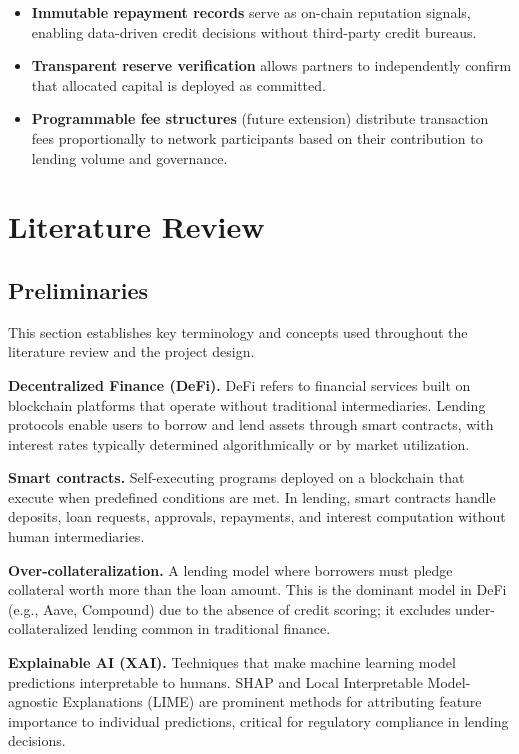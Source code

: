 \documentclass[12pt,a4paper]{report}
\begin{document}
\begin{itemize}[noitemsep]
\item \textbf{Immutable repayment records} serve as on-chain reputation signals, enabling data-driven credit decisions without third-party credit bureaus.
\item \textbf{Transparent reserve verification} allows partners to independently confirm that allocated capital is deployed as committed.
\item \textbf{Programmable fee structures} (future extension) distribute transaction fees proportionally to network participants based on their contribution to lending volume and governance.
\end{itemize}


\chapter{Literature Review}

\section{Preliminaries}

This section establishes key terminology and concepts used throughout the literature review and the project design.

\hangindent=0.5in \textbf{Decentralized Finance (DeFi).} DeFi refers to financial services built on blockchain platforms that operate without traditional intermediaries. Lending protocols enable users to borrow and lend assets through smart contracts, with interest rates typically determined algorithmically or by market utilization.

\hangindent=0.5in \textbf{Smart contracts.} Self-executing programs deployed on a blockchain that execute when predefined conditions are met. In lending, smart contracts handle deposits, loan requests, approvals, repayments, and interest computation without human intermediaries.

\hangindent=0.5in \textbf{Over-collateralization.} A lending model where borrowers must pledge collateral worth more than the loan amount. This is the dominant model in DeFi (e.g., Aave, Compound) due to the absence of credit scoring; it excludes under-collateralized lending common in traditional finance.

\hangindent=0.5in \textbf{Explainable AI (XAI).} Techniques that make machine learning model predictions interpretable to humans. SHAP and Local Interpretable Model-agnostic Explanations (LIME) are prominent methods for attributing feature importance to individual predictions, critical for regulatory compliance in lending decisions.
\end{document}
